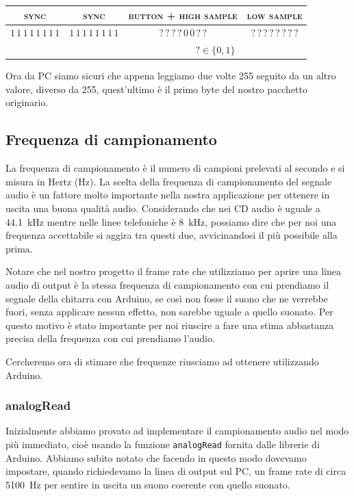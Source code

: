 \documentclass[a4paper,11pt]{article}
\begin{document}
\begin{table}[h]
\begin{tabular}{cccc}
\textsc{\color[HTML]{FE0000}sync} & \textsc{\color[HTML]{FE0000}sync} & \textsc{button + high sample} & \textsc{low sample}       \\ \hline
\multicolumn{1}{|c|}{\color[HTML]{FE0000}$1\,1\,1\,1\, 1\, 1\, 1\, 1 $} &\multicolumn{1}{|c|}{\color[HTML]{FE0000}$1\,1\,1\,1\, 1\, 1\, 1\, 1 $} &\multicolumn{1}{|c|}{${?\,?\,?\,?}\, 0\, 0\, ?\, ? $} & \multicolumn{1}{c|}{$?\,?\,?\,?\,?\,?\,?\,?$} \\ \hline
\multicolumn{2}{c}{} & \multicolumn{2}{c}{$? \in \{0, 1\}$}
\end{tabular}
\end{table}

Ora da PC siamo sicuri che appena leggiamo due volte 255 seguito da un altro valore, diverso da 255, quest'ultimo è il primo byte del nostro pacchetto originario.

\subsection{Frequenza di campionamento}
La frequenza di campionamento è il numero di campioni prelevati al secondo e si misura in Hertz (\si{\hertz}).
La scelta della frequenza di campionamento del segnale audio è un fattore molto importante nella nostra applicazione per ottenere in uscita una buona qualità audio. Considerando che nei CD audio è uguale a \SI{44.1}{\kilo\hertz} mentre nelle linee telefoniche è \SI{8}{\kilo\hertz}, possiamo dire che per noi una frequenza accettabile si aggira tra questi due, avvicinandosi il più possibile alla prima.

Notare che nel nostro progetto il frame rate che utilizziamo per aprire una linea audio di output è la stessa frequenza di campionamento con cui prendiamo il segnale della chitarra con Arduino, se così non fosse il suono che ne verrebbe fuori, senza applicare nessun effetto, non sarebbe uguale a quello suonato. Per questo motivo è stato importante per noi riuscire a fare una stima abbastanza precisa della frequenza con cui prendiamo l'audio.

Cercheremo ora di stimare che frequenze riusciamo ad ottenere utilizzando Arduino.

\subsubsection{analogRead}
Inizialmente abbiamo provato ad implementare il campionamento audio nel modo più immediato, cioè usando la funzione \texttt{analogRead} fornita dalle librerie di Arduino. 
Abbiamo subito notato che facendo in questo modo dovevamo impostare, quando richiedevamo la linea di output sul PC, un frame rate di circa \SI{5100}{\hertz} per sentire in uscita un suono coerente con quello suonato.
\end{document}

